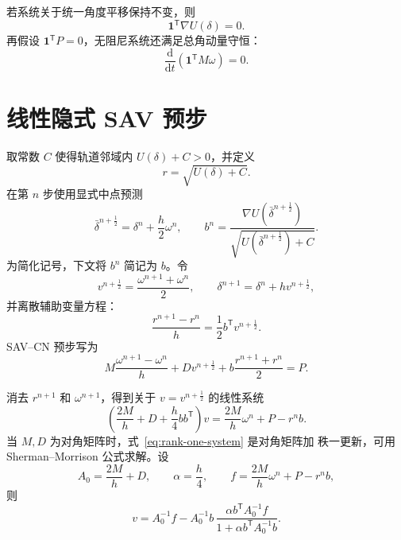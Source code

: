 \documentclass[UTF8,11pt,a4paper]{ctexart}
\theoremstyle{definition}
\theoremstyle{remark}
\newcommand{\trans}{\mathsf{T}}
\newcommand{\ones}{\bm{1}}
\newcommand{\dd}{\mathrm{d}}
\begin{document}
若系统关于统一角度平移保持不变，则
\begin{equation}
  \ones^{\trans}\nabla U(\delta)=0.
\end{equation}
再假设 \(\ones^{\trans}P=0\)，无阻尼系统还满足总角动量守恒：
\begin{equation}
  \frac{\dd}{\dd t}\left(\ones^{\trans}M\omega\right)=0.
  \label{eq:continuous-momentum}
\end{equation}

\section{线性隐式 SAV 预步}

取常数 \(C\) 使得轨道邻域内 \(U(\delta)+C>0\)，并定义
\begin{equation}
  r=\sqrt{U(\delta)+C}.
  \label{eq:sav-variable}
\end{equation}
在第 \(n\) 步使用显式中点预测
\begin{equation}
  \bar\delta^{n+\frac12}
  =\delta^n+\frac{h}{2}\omega^n,
  \qquad
  b^n
  =\frac{\nabla U(\bar\delta^{n+\frac12})}
  {\sqrt{U(\bar\delta^{n+\frac12})+C}}.
  \label{eq:sav-predictor}
\end{equation}
为简化记号，下文将 \(b^n\) 简记为 \(b\)。令
\begin{equation}
  v^{n+\frac12}
  =\frac{\omega^{n+1}+\omega^n}{2},
  \qquad
  \delta^{n+1}=\delta^n+h v^{n+\frac12},
  \label{eq:mid-velocity}
\end{equation}
并离散辅助变量方程：
\begin{equation}
  \frac{r^{n+1}-r^n}{h}
  =\frac12 b^{\trans}v^{n+\frac12}.
  \label{eq:r-update}
\end{equation}
SAV--CN 预步写为
\begin{equation}
  M\frac{\omega^{n+1}-\omega^n}{h}
  +Dv^{n+\frac12}
  +b\frac{r^{n+1}+r^n}{2}=P.
  \label{eq:sav-cn}
\end{equation}

消去 \(r^{n+1}\) 和 \(\omega^{n+1}\)，得到关于
\(v=v^{n+\frac12}\) 的线性系统
\begin{equation}
  \boxed{
  \left(\frac{2M}{h}+D+\frac{h}{4}bb^{\trans}\right)v
  =\frac{2M}{h}\omega^n+P-r^n b.}
  \label{eq:rank-one-system}
\end{equation}
当 \(M,D\) 为对角矩阵时，式~\eqref{eq:rank-one-system} 是对角矩阵加
秩一更新，可用 Sherman--Morrison 公式求解。设
\begin{equation}
  A_0=\frac{2M}{h}+D,
  \qquad \alpha=\frac{h}{4},
  \qquad f=\frac{2M}{h}\omega^n+P-r^n b,
\end{equation}
则
\begin{equation}
  v=A_0^{-1}f
  -A_0^{-1}b\,
  \frac{\alpha b^{\trans}A_0^{-1}f}
       {1+\alpha b^{\trans}A_0^{-1}b}.
  \label{eq:sherman-morrison}
\end{equation}
\end{document}
